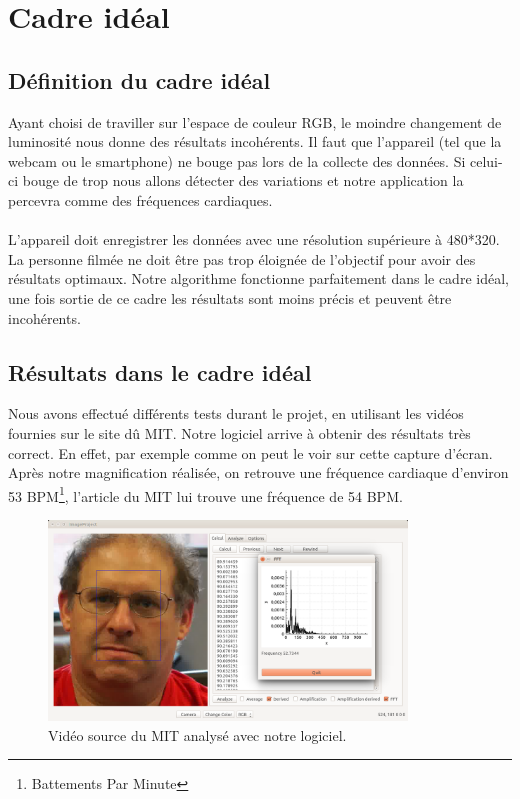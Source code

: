\section{Cadre idéal}

\subsection{Définition du cadre idéal}
Ayant choisi de traviller sur l'espace de couleur RGB, le moindre changement de luminosité nous donne des résultats incohérents. Il faut que l'appareil (tel que la webcam ou le smartphone) ne bouge pas 
lors de la collecte des données. Si celui-ci bouge de trop nous allons détecter des variations et 
notre application la percevra comme des fréquences cardiaques.\\\\
L'appareil doit enregistrer les données avec une résolution supérieure à 480*320.\\
La personne filmée ne doit être pas trop éloignée de l'objectif pour avoir des résultats optimaux.
Notre algorithme fonctionne parfaitement dans le cadre idéal, une fois sortie de ce cadre les résultats sont moins précis et peuvent être incohérents. \\

\subsection{Résultats dans le cadre idéal}
Nous avons effectué différents tests durant le projet, en utilisant les vidéos fournies sur le site dû MIT\@. Notre logiciel arrive à obtenir des
résultats très correct. En effet, par exemple comme on peut le voir sur cette capture d'écran. Après notre magnification réalisée, on retrouve
une fréquence cardiaque d'environ 53 BPM\footnote{Battements Par Minute}, l'article du MIT lui trouve une fréquence de 54 BPM\@.

\begin{figure}[h!]
	\centering
	\includegraphics[width=0.85\textwidth]{data/cas-ideal.png}
	\caption{Vidéo source du MIT analysé avec notre logiciel.}
\end{figure}


